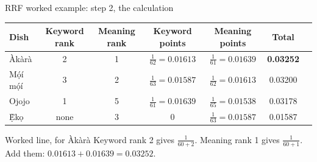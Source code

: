 \documentclass[aspectratio=169,11pt]{beamer}
\begin{document}
\begin{frame}{RRF worked example: step 2, the calculation}
  \centering\footnotesize
  \renewcommand{\arraystretch}{1.35}
  \begin{tabular}{@{}lcccccc@{}}
    \toprule
    Dish & Keyword rank & Meaning rank & Keyword points & Meaning points & \textbf{Total} \\
    \midrule
    Àkàrà & 2 & 1 & $\frac{1}{62} = 0.01613$ & $\frac{1}{61} = 0.01639$ & \alert{\textbf{0.03252}} \\
    Mọ́í mọ́í & 3 & 2 & $\frac{1}{63} = 0.01587$ & $\frac{1}{62} = 0.01613$ & 0.03200 \\
    Ojojo & 1 & 5 & $\frac{1}{61} = 0.01639$ & $\frac{1}{65} = 0.01538$ & 0.03178 \\
    Ẹ̀kọ & none & 3 & 0 & $\frac{1}{63} = 0.01587$ & 0.01587 \\
    \bottomrule
  \end{tabular}

  \vspace{0.4cm}
  \begin{block}{Worked line, for Àkàrà}
    \small Keyword rank 2 gives $\frac{1}{60+2}$. Meaning rank 1 gives $\frac{1}{60+1}$. Add them: $0.01613 + 0.01639 = 0.03252$.
  \end{block}
\end{frame}
\end{document}
